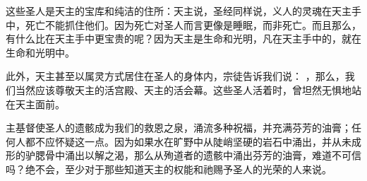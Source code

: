这些圣人是天主的宝库和纯洁的住所：天主说，圣经同样说，义人的灵魂在天主手中，死亡不能抓住他们。因为死亡对圣人而言更像是睡眠，而非死亡。而且那么，有什么比在天主手中更宝贵的呢？因为天主是生命和光明，凡在天主手中的，就在生命和光明中。\par

此外，天主甚至以属灵方式居住在圣人的身体内，宗徒告诉我们说： ，那么，我们当然应该尊敬天主的活宫殿、天主的活会幕。这些圣人活着时，曾坦然无惧地站在天主面前。\par

主基督使圣人的遗骸成为我们的救恩之泉，涌流多种祝福，并充满芬芳的油膏；任何人都不应怀疑这一点。因为如果水在旷野中从陡峭坚硬的岩石中涌出，并从未成形的驴腮骨中涌出以解之渴，那么从殉道者的遗骸中涌出芬芳的油膏，难道不可信吗？绝不会，至少对于那些知道天主的权能和祂赐予圣人的光荣的人来说。\par

